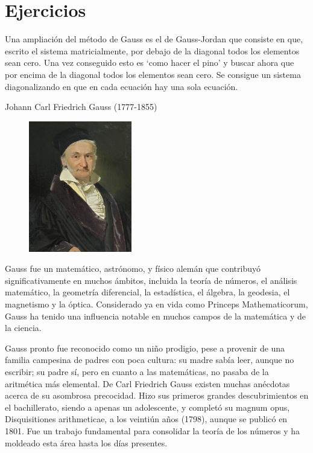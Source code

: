 \section{Ejercicios}

Una ampliación del método de Gauss es el de Gauss-Jordan que consiste en que, escrito el sistema matricialmente, por debajo de la diagonal todos los elementos sean cero. Una vez conseguido esto es `como hacer el pino' y buscar ahora que por encima de la diagonal todos los elementos sean cero. Se consigue un sistema diagonalizando en que en cada ecuación hay una sola ecuación.
	
\vspace{6mm}

\begin{myexampleblock}{Johann Carl Friedrich Gauss (1777-1855)}
\begin{multicols}{2}
	\begin{figure}[H]
		\centering
		\includegraphics[width=0.4\textwidth]{imagenes/imagenes01/T01IM04.png}
	\end{figure}

Gauss fue un matemático, astrónomo, y físico alemán que contribuyó significativamente en muchos ámbitos, incluida la teoría de números, el análisis matemático, la geometría diferencial, la estadística, el álgebra, la geodesia, el magnetismo y la óptica. Considerado ya en vida como Princeps Mathematicorum, Gauss ha tenido una influencia notable en muchos campos de la matemática y de la ciencia.
\end{multicols}
Gauss pronto fue reconocido como un niño prodigio, pese a provenir de una familia campesina de padres con poca cultura: su madre sabía leer, aunque no escribir; su padre sí, pero en cuanto a las matemáticas, no pasaba de la aritmética más elemental. De Carl Friedrich Gauss existen muchas anécdotas acerca de su asombrosa precocidad. Hizo sus primeros grandes descubrimientos en el bachillerato, siendo a apenas un adolescente, y completó su magnum opus, Disquisitiones arithmeticae, a los veintiún años (1798), aunque se publicó en 1801. Fue un trabajo fundamental para consolidar la teoría de los números y ha moldeado esta área hasta los días presentes.

\end{myexampleblock}	
	

